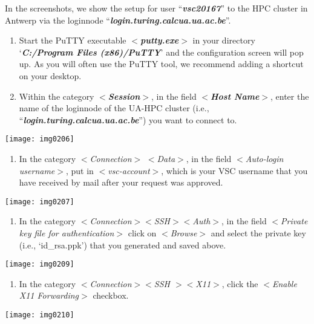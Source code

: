 In the screenshots, we show the setup for user ``\textbf{\textit{vsc20167}}'' to the HPC cluster in Antwerp via the loginnode ``\textbf{\textit{login.turing.calcua.ua.ac.be}}''.



\begin{enumerate}
\item  Start the PuTTY executable $<$\textbf{\textit{putty.exe}}$>$ in your directory `\textbf{\textit{C:/Program Files (x86)/PuTTY}}' and the configuration screen will pop up. As you will often use the PuTTY tool, we recommend adding a shortcut on your desktop.
\item  Within the category $<$\textbf{\textit{Session}}$>$, in the field $<$\textbf{\textit{Host Name}}$>$, enter the name of the loginnode of the UA-HPC cluster (i.e., ``\textbf{\textit{login.turing.calcua.ua.ac.be}}'') you want to connect to.
\end{enumerate}

\texttt{[image: img0206]}

\begin{enumerate}
\item  In the category $<$\textit{Connection}$>$ $<$\textit{Data}$>$, in the field $<$\textit{Auto-login username}$>$, put in $<$\textit{vsc-account}$>$, which is your VSC username that you have received by mail after your request was approved.
\end{enumerate}

\texttt{[image: img0207]}

\begin{enumerate}
\item  In the category $<$\textit{Connection$>$$<$SSH$>$$<$Auth$>$}, in the field $<$\textit{Private key file for authentication}$>$ click on $<$\textit{Browse}$>$ and select the private key (i.e., `id\_rsa.ppk') that you generated and saved above.
\end{enumerate}

\texttt{[image: img0209]}

\begin{enumerate}
\item  In the category $<$\textit{Connection$>$$<$SSH $>$$<$X11$>$}, click the $<$\textit{Enable X11 Forwarding}$>$ checkbox.
\end{enumerate}

\texttt{[image: img0210]}



